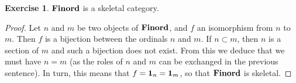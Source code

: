 \documentclass[11pt,a4paper,twoside]{article}
\newcommand{\aname}[1]{{\normalfont\textbf{#1}}}
\newcommand{\Id}{\aname{1}}
\newcommand{\catname}[1]{{\normalfont\textbf{#1}}}
\newcommand{\Finord}{\catname{Finord}}
\theoremstyle{definition}
\newcounter{excounter}
\newtheorem{exercise}[excounter]{Exercise}
\begin{document}
\begin{exercise}

  $\Finord$ is a skeletal category.

\end{exercise}

\begin{proof}

  Let $n$ and $m$ be two objects of $\Finord$, and $f$ an isomorphism from $n$ to $m$. Then $f$ is a bijection between the ordinals $n$ and $m$. If $n \subset m$, then $n$ is a section of $m$ and such a bijection does not exist. From this we deduce that we must have $n = m$ (as the roles of $n$ and $m$ can be exchanged in the previous sentence). In turn, this means that $f = \Id_n = \Id_m$, so that $\Finord$ is skeletal.

\end{proof}
\end{document}
